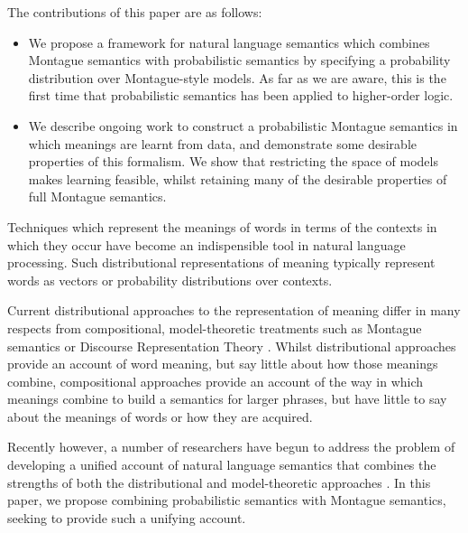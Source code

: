 \documentclass{svmult}
\begin{document}
The contributions of this paper are as follows:
\begin{itemize}
\item We propose a framework for natural language semantics which
  combines Montague semantics with probabilistic semantics by
  specifying a probability distribution over Montague-style models. As
  far as we are aware, this is the first time that probabilistic
  semantics has been applied to higher-order logic.
\item We describe ongoing work to construct a probabilistic Montague
  semantics in which meanings are learnt from data, and demonstrate
  some desirable properties of this formalism. We show that
  restricting the space of models makes learning feasible, whilst
  retaining many of the desirable properties of full Montague
  semantics.
\end{itemize}

Techniques which represent the meanings of words in terms of the contexts in
which they occur have become an indispensible tool in natural language
processing. Such distributional representations of meaning typically
represent words as vectors or probability distributions over
contexts.


Current distributional approaches to the representation of meaning
differ in many respects from compositional, model-theoretic treatments
such as Montague semantics or Discourse Representation Theory
\cite{Blackburn:05}. Whilst distributional approaches provide an
account of word meaning, but say little about how those meanings
combine, compositional approaches provide an account of the way in
which meanings combine to build a semantics for larger phrases, but
have little to say about the meanings of words or how they are
acquired.

Recently however, a number of researchers have begun to address the
problem of developing a unified account of natural language semantics
that combines the strengths of both the distributional and
model-theoretic approaches
\cite{Clarke:07,Coecke:10,Garrette:11,Lewis:13}.  In this paper, we
propose combining probabilistic semantics with Montague semantics,
seeking to provide such a unifying account.
\end{document}
